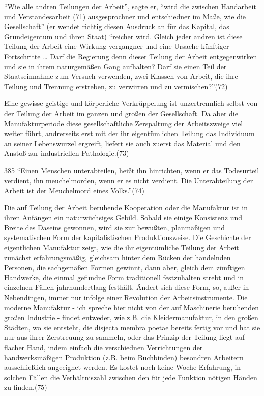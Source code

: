 {``Wie alle andren Teilungen der Arbeit'', sagte er, ``wird die zwischen
Handarbeit und Verstandesarbeit (71) ausgesprochner und entschiedner im
Maße, wie die Gesellschaft'' (er wendet richtig diesen Ausdruck an für
das Kapital, das Grundeigentum und ihren Staat) ``reicher wird. Gleich
jeder andren ist diese Teilung der Arbeit eine Wirkung vergangner und
eine Ursache künftiger Fortschritte \ldots{} Darf die Regierung denn
dieser Teilung der Arbeit entgegenwirken und sie in ihrem naturgemäßen
Gang aufhalten? Darf sie einen Teil der Staatseinnahme zum Versuch
verwenden, zwei Klassen von Arbeit, die ihre Teilung und Trennung
erstreben, zu verwirren und zu vermischen?''(72)

Eine gewisse geistige und körperliche Verkrüppelung ist unzertrennlich
selbst von der Teilung der Arbeit im ganzen und großen der Gesellschaft.
Da aber die Manufakturperiode diese gesellschaftliche Zerspaltung der
Arbeitszweige viel weiter führt, andrerseits erst mit der ihr
eigentümlichen Teilung das Individuum an seiner Lebenswurzel ergreift,
liefert sie auch zuerst das Material und den Anstoß zur industriellen
Pathologie.(73)

\num{385} ``Einen Menschen unterabteilen, heißt ihn
hinrichten, wenn er das Todesurteil verdient, ihn meuchelmorden, wenn er
es nicht verdient. Die Unterabteilung der Arbeit ist der Meuchelmord
eines Volks.''(74)

Die auf Teilung der Arbeit beruhende Kooperation oder die Manufaktur ist
in ihren Anfängen ein naturwüchsiges Gebild. Sobald sie einige
Konsistenz und Breite des Daseins gewonnen, wird sie zur bewußten,
planmäßigen und systematischen Form der kapitalistischen
Produktionsweise. Die Geschichte der eigentlichen Manufaktur zeigt, wie
die ihr eigentümliche Teilung der Arbeit zunächst erfahrungsmäßig,
gleichsam hinter dem Rücken der handelnden Personen, die sachgemäßen
Formen gewinnt, dann aber, gleich dem zünftigen Handwerke, die einmal
gefundne Form traditionell festzuhalten strebt und in einzelnen Fällen
jahrhundertlang festhält. Ändert sich diese Form, so, außer in
Nebendingen, immer nur infolge einer Revolution der Arbeitsinstrumente.
Die moderne Manufaktur - ich spreche hier nicht von der auf Maschinerie
beruhenden großen Industrie - findet entweder, wie z.B. die
Kleidermanufaktur, in den großen Städten, wo sie entsteht, die disjecta
membra poetae bereits fertig vor und hat sie nur aus ihrer Zerstreuung
zu sammeln, oder das Prinzip der Teilung liegt auf flacher Hand, indem
einfach die verschiednen Verrichtungen der handwerksmäßigen Produktion
(z.B. beim Buchbinden) besondren Arbeitern ausschließlich angeeignet
werden. Es kostet noch keine Woche Erfahrung, in solchen Fällen die
Verhältniszahl zwischen den für jede Funktion nötigen Händen zu
finden.(75)

}
